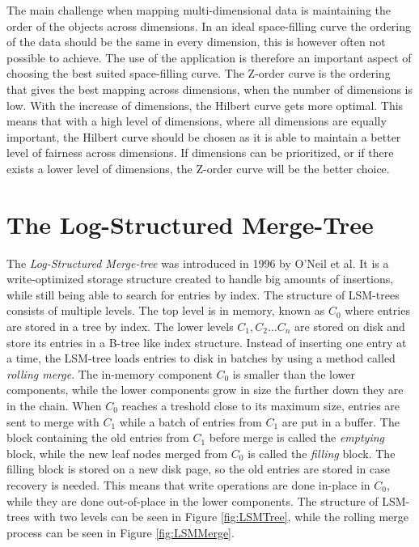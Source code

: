 \noindent
The main challenge when mapping multi-dimensional data is maintaining the order of the objects across dimensions. In an ideal space-filling curve the ordering of the data should be the same in every dimension, this is however often not possible to achieve. The use of the application is therefore an important aspect of choosing the best suited space-filling curve. The Z-order curve is the ordering that gives the best mapping across dimensions, when the number of dimensions is low. With the increase of dimensions, the Hilbert curve gets more optimal\cite{IrregularSpace}. This means that with a high level of dimensions, where all dimensions are equally important, the Hilbert curve should be chosen as it is able to maintain a better level of fairness across dimensions. If dimensions can be prioritized, or if there exists a lower level of dimensions, the Z-order curve will be the better choice.

\section{The Log-Structured Merge-Tree}
The \emph{Log-Structured Merge-tree} was introduced in 1996 by O'Neil et al\cite{LSMTree}. It is a write-optimized storage structure created to handle big amounts of insertions, while still being able to search for entries by index. The structure of LSM-trees consists of multiple levels. The top level is in memory, known as $C_0$ where entries are stored in a tree by index. The lower levels $C_1, C_2 ... C_n$ are stored on disk and store its entries in a B-tree like index structure. Instead of inserting one entry at a time, the LSM-tree loads entries to disk in batches by using a method called \emph{rolling merge}. The in-memory component $C_0$ is smaller than the lower components, while the lower components grow in size the further down they are in the chain. When $C_0$ reaches a treshold close to its maximum size, entries are sent to merge with $C_1$ while a batch of entries from $C_1$ are put in a buffer. The block containing the old entries from $C_1$ before merge is called the \emph{emptying} block, while the new leaf nodes merged from $C_0$ is called the \emph{filling} block. The filling block is stored on a new disk page, so the old entries are stored in case recovery is needed. This means that write operations are done in-place in $C_0$, while they are done out-of-place in the lower components. The structure of LSM-trees with two levels can be seen in Figure \ref{fig:LSMTree}, while the rolling merge process can be seen in Figure \ref{fig:LSMMerge}. 

